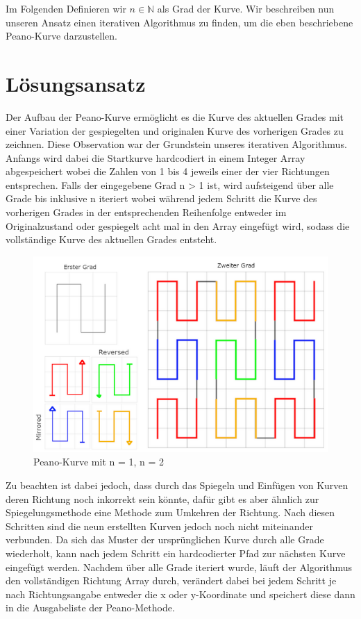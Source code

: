 \documentclass[course=asp]{aspdoc}
\begin{document}
Im Folgenden Definieren wir $n \in \mathbb{N}$ als Grad der Kurve.
Wir beschreiben nun unseren Ansatz einen iterativen Algorithmus zu finden, um die eben beschriebene Peano-Kurve darzustellen. %

\newpage

\section{Lösungsansatz}
Der Aufbau der Peano-Kurve ermöglicht es die Kurve des aktuellen Grades mit einer Variation der gespiegelten und originalen Kurve des vorherigen Grades zu zeichnen.
Diese Observation war der Grundstein unseres iterativen Algorithmus. Anfangs wird dabei die Startkurve hardcodiert in einem Integer Array abgespeichert wobei die Zahlen von 1 bis 4 jeweils einer der vier Richtungen entsprechen. Falls der eingegebene Grad n > 1 ist, wird aufsteigend über alle Grade bis inklusive n iteriert wobei während jedem Schritt die Kurve des vorherigen Grades in der entsprechenden Reihenfolge entweder im Originalzustand oder gespiegelt acht mal in den Array eingefügt wird, sodass die vollständige Kurve des aktuellen Grades entsteht. 

\begin{figure} 	%
\centering
\includegraphics{PeanoFarbcodiert.png}
\caption{Peano-Kurve mit n = 1, n = 2}\label{Abb:Peano Lösungsidee}
\end{figure}

Zu beachten ist dabei jedoch, dass durch das Spiegeln und Einfügen von Kurven deren Richtung noch inkorrekt sein könnte, dafür gibt es aber ähnlich zur Spiegelungsmethode eine Methode zum Umkehren der Richtung. Nach diesen Schritten sind die neun erstellten Kurven jedoch noch nicht miteinander verbunden. Da sich das Muster der ursprünglichen Kurve durch alle Grade wiederholt, kann nach jedem Schritt ein hardcodierter Pfad zur nächsten Kurve eingefügt werden.
Nachdem über alle Grade iteriert wurde, läuft der Algorithmus den vollständigen Richtung Array durch, verändert dabei bei jedem Schritt je nach Richtungsangabe entweder die x oder y-Koordinate und speichert diese dann in die Ausgabeliste der Peano-Methode.
\end{document}
